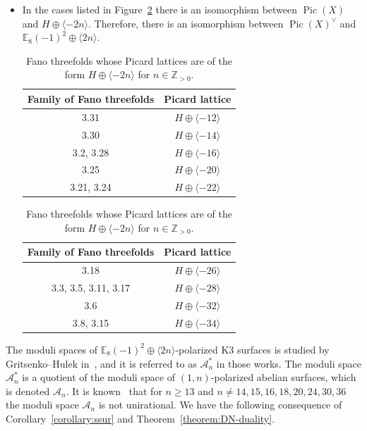 \documentclass[10pt]{amsart}
\numberwithin{equation}{section}
\theoremstyle{plain}
\theoremstyle{definition}
\theoremstyle{remark}
\DeclareMathOperator{\Pic}{Pic}
\begin{document}
\begin{itemize}[\quad -]
\item In the cases listed in Figure~\ref{figure:modular} there is an isomorphism between \(\Pic(X)\) and \(H \oplus \langle -2n \rangle\). Therefore, there is an isomorphism between \(\Pic(X)^\vee\) and \(\mathbb{E}_8(-1)^2 \oplus \langle 2n \rangle\).

\begin{table}[H]
  \begin{minipage}[t]{0.45\textwidth}
    \begin{tabular}{|c|c|}
      \hline
      Family of Fano threefolds & Picard lattice \\
      \hline
      \hline
      3.31 & \(H \oplus \langle -12 \rangle\) \\
      \hline
      3.30 & \(H \oplus \langle -14 \rangle\) \\
      \hline
      3.2, 3.28  & \(H \oplus \langle -16 \rangle\) \\
      \hline
      3.25 & \(H \oplus \langle -20 \rangle\) \\
      \hline
      3.21, 3.24 & \(H \oplus \langle -22 \rangle\) \\
      \hline
    \end{tabular}
  \end{minipage}%
  \begin{minipage}[t]{0.45\textwidth}
    \begin{tabular}{|c|c|}
      \hline
      Family of Fano threefolds & Picard lattice \\
      \hline
      \hline
      3.18 & \(H \oplus \langle -26 \rangle\) \\
      \hline
      3.3, 3.5, 3.11, 3.17  & \(H \oplus \langle -28 \rangle\) \\
      \hline
      3.6 & \(H \oplus \langle -32 \rangle\) \\
      \hline
      3.8, 3.15 & \(H \oplus \langle -34 \rangle\) \\
      \hline
    \end{tabular}
  \end{minipage}
  \caption{Fano threefolds whose Picard lattices are of the form \(H \oplus \langle -2n \rangle\) for \(n \in \mathbb{Z}_{> 0}\).}\label{figure:modular}
  \end{table}
\end{itemize}

The moduli spaces of \(\mathbb{E}_8(-1)^2 \oplus \langle 2n \rangle\)-polarized K3 surfaces is studied by Gritsenko--Hulek in~\cite{gritsenko1998minimal}, and it is referred to as \(\mathcal{A}^*_{n}\) in those works. The moduli space \(\mathcal{A}_n^*\) is a quotient of the moduli space of \((1,n)\)-polarized abelian surfaces, which is denoted \(\mathcal{A}_n\). It is known~\cite{gritsenko1994irrationality} that for \(n \geq 13\) and \(n \neq 14,  15, 16, 18, 20, 24, 30, 36\) the moduli space \(\mathcal{A}_n\) is not unirational. We have the following consequence of Corollary~\ref{corollary:ssur} and Theorem~\ref{theorem:DN-duality}.
\end{document}
